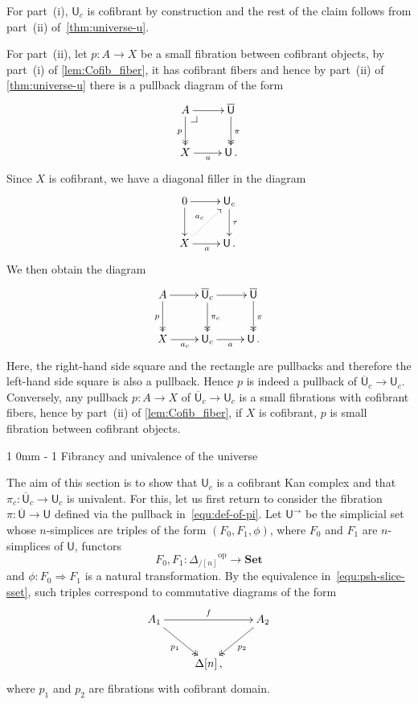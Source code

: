 \documentclass[reqno,10pt,a4paper,oneside,draft]{amsart}
\makeatletter
\renewenvironment{proof}[1][\proofname] {\par\pushQED{\qed}\normalfont\topsep6\p@\@plus6\p@\relax\trivlist\item[\hskip\labelsep\bf#1\@addpunct{.}]\ignorespaces}{\popQED\endtrivlist\@endpefalse}
\renewcommand{\section}{\@startsection
{section}%
{1}%
{0mm}%
{-\baselineskip}%
{1\baselineskip}%
{\Large \bfseries}}%
\numberwithin{equation}{section}
\theoremstyle{mythm}
\theoremstyle{mydef}
\theoremstyle{myrmk}
\newcommand{\pullback}[1]{\save*!/#1-1.2pc/#1:(-1,1)@^{|-}\restore}
\newcommand{\drpullback}{\pullback{dr}}
\newcommand{\ie}{\text{i.e.\ }}
\newcommand{\co}{\colon}
\newcommand{\op}{\operatorname{op}}
\newcommand{\UU}{\overline{\mathsf{U}}}
\newcommand{\U}{\mathsf{U}}
\newcommand{\Set}{\mathbf{Set}}
\makeatother
\begin{document}
\begin{proof} For part~(i), $\U_c$ is cofibrant by construction and the rest of the claim follows from part~(ii) of~\cref{thm:universe-u}. 


For part~(ii), let $p \co A \to X$ be a small fibration between cofibrant objects, by part~(i) of \cref{lem:Cofib_fiber}, it has cofibrant fibers and hence by part~(ii) of \cref{thm:universe-u} there is a pullback diagram of the form 
\[
\xymatrix{
A \ar[r] \ar@{->>}[d]_p \drpullback & \UU \ar@{->>}[d]^{\pi} \\
X \ar[r]_a & \U \, . }
\]
Since $X$ is cofibrant, we have a diagonal filler in the diagram
\[
\xymatrix{
0 \ar[r] \ar[d] & \U_c \ar[d]^{\tau} \\
X \ar[r]_a \ar@{.>}[ur]^{a_c} & \U \, . }
\]
 We then obtain the diagram
\[
\xymatrix{
A \ar[r] \ar@{->>}[d]_p &  \UU_c \ar[r]  \ar@{->>}[d]^{\pi_c}  & \UU \ar@{->>}[d]^{\pi} \\
X \ar[r]_{a_c} & \U_c \ar[r]_{a} &  \U \, . }
\]
Here, the right-hand side square and the rectangle are pullbacks and therefore the left-hand
side square is also a pullback. Hence $p$ is indeed a pullback of $\UU_c \rightarrow \U_c$. Conversely, any pullback  $p \co A \rightarrow X$ of $\UU_c \rightarrow \U_c$ is a small fibrations with cofibrant fibers, hence by part~(ii) of \ref{lem:Cofib_fiber}, if $X$ is cofibrant, $p$ is small fibration between cofibrant objects.
\end{proof} 


\section{Fibrancy and univalence of the universe}
\label{sec:fibrancy-and-univalence}


The aim of this section is to show that $\U_c$ is a cofibrant Kan complex and that $\pi_c \co
\UU_c \to \U_c$ is univalent.  For this, let us first return to consider the fibration $\pi \co \UU \to \U$ defined
via the pullback in~\eqref{equ:def-of-pi}. Let $\U^{\rightarrow}$ be the simplicial set whose $n$-simplices are triples of the form $(F_0, F_1, \phi)$, where $F_0$ and $F_1$ are $n$-simplices of $\U$, \ie functors
 \[
F_0, F_1 \co {\Delta_{/[n]}}^{\op} \rightarrow \Set
\]
and $\phi \co F_0 \Rightarrow F_1$ is a natural transformation. By the equivalence in~\eqref{equ:psh-slice-sset},
such triples correspond to commutative diagrams of the form
\begin{equation}
\label{equ:corresp}
\begin{gathered}
\xymatrix{ 
A_1 \ar[rr]^{f} \ar@{->>}[dr]_{p_1} & & A_2 \ar@{->>}[dl]^{p_2} \\
& \Delta[n] \, , & }
\end{gathered}
\end{equation}
where $p_1$ and $p_2$ are fibrations with cofibrant domain.
\end{document}
